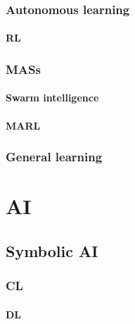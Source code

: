 \documentclass[12pt,a4paper,openright,twoside]{book}
\begin{document}
\subsection{Autonomous learning}\label{subsec:autonomous-learning}

\subsubsection{\Acl{RL}}\label{subsubsec:rl}

\subsection{\Aclp{MAS}}\label{subsec:mas}

\subsubsection{Swarm intelligence}\label{subsubsec:swarm-intelligence}

\subsubsection{\Acl{MARL}}\label{subsubsec:marl}

\subsection{General learning}\label{subsec:general-learning}


\chapter{\Acl{AI}}\label{ch:ai}

\section{Symbolic \ac{AI}}\label{sec:symbolic-ai}

\subsection{\Acl{CL}}\label{subsec:cl}

\subsubsection{\Acl{DL}}\label{subsubsec:dl}
\end{document}
